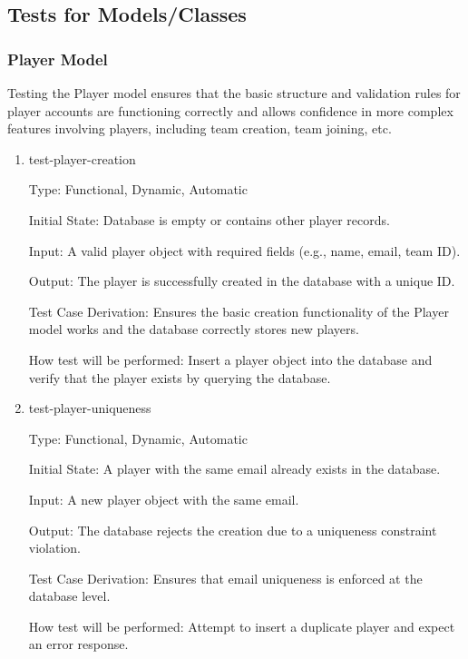 \documentclass[12pt, titlepage]{article}
\begin{document}
\subsection{Tests for Models/Classes}

\subsubsection{Player Model}

Testing the Player model ensures that the basic structure and validation rules for player accounts are functioning correctly and allows confidence in more complex features involving players, including team creation, team joining, etc.

\begin{enumerate}

    \item{test-player-creation\\}

    Type: Functional, Dynamic, Automatic

    Initial State: Database is empty or contains other player records.

    Input: A valid player object with required fields (e.g., name, email, team ID).

    Output: The player is successfully created in the database with a unique ID.

    Test Case Derivation: Ensures the basic creation functionality of the Player model works and the database correctly stores new players.

    How test will be performed: Insert a player object into the database and verify that the player exists by querying the database.

\item{test-player-uniqueness\\}

    Type: Functional, Dynamic, Automatic

    Initial State: A player with the same email already exists in the database.

    Input: A new player object with the same email.

    Output: The database rejects the creation due to a uniqueness constraint violation.

    Test Case Derivation: Ensures that email uniqueness is enforced at the database level.

    How test will be performed: Attempt to insert a duplicate player and expect an error response.

\end{enumerate}
\end{document}
